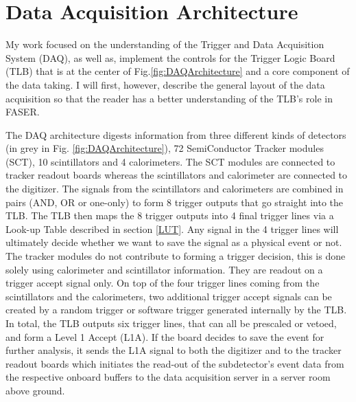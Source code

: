 
\ifpdf
    \graphicspath{{ChapterDAQ/Figs/Raster/}{ChapterDAQ/Figs/PDF/}{ChapterDAQ/Figs/}}
\else
    \graphicspath{{ChapterDAQ/Figs/Vector/}{ChapterDAQ/Figs/}}
\fi

\chapter{Data Acquisition Architecture}



My work focused on the understanding of the Trigger and Data Acquisition System (DAQ), as well as, implement the controls for the Trigger Logic Board (TLB) that is at the center of Fig.\ref{fig:DAQArchitecture} and a core component of the data taking. I will first, however, describe the general layout of the data acquisition so that the reader has a better understanding of the TLB's role in FASER.

The DAQ architecture digests information from three different kinds of detectors (in grey in Fig. \ref{fig:DAQArchitecture}), 72 SemiConductor Tracker modules (SCT), 10 scintillators and 4 calorimeters. The SCT modules are connected to tracker readout boards whereas the scintillators and calorimeter are connected to the digitizer. The signals from the scintillators and calorimeters are combined in pairs (AND, OR or one-only) to form 8 trigger outputs that go straight into the TLB. The TLB then maps the 8 trigger outputs into 4 final trigger lines via a Look-up Table described in section \ref{LUT}. Any signal in the 4 trigger lines will ultimately decide whether we want to save the signal as a physical event or not. The tracker modules do not contribute to forming a trigger decision, this is done solely using calorimeter and scintillator information. They are readout on a trigger accept signal only. On top of the four trigger lines coming from the scintillators and the calorimeters, two additional trigger accept signals can be created by a random trigger or software trigger generated internally by the TLB. In total, the TLB outputs six trigger lines, that can all be prescaled or vetoed, and form a Level 1 Accept (L1A). If the board decides to save the event for further analysis, it sends the L1A signal to both the digitizer and to the tracker readout boards which initiates the read-out of the subdetector's event data from the respective onboard buffers to the data acquisition server in a server room above ground.


